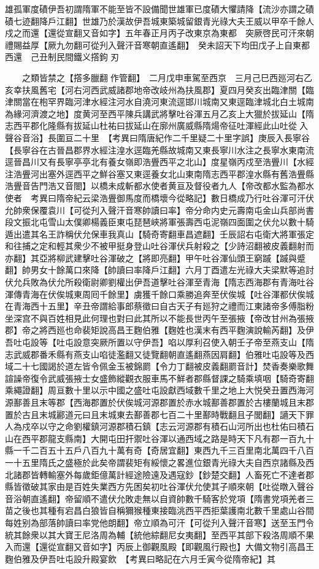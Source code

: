 雄孤軍度磧伊吾初謂隋軍不能至皆不設備聞世雄軍已度磧大懼請降【流沙亦謂之磧磧七迹翻降戶江翻】世雄乃於漢故伊吾城東築城留銀青光祿大夫王威以甲卒千餘人戍之而還【還從宣翻又音如字】五年春正月丙子改東京為東都　突厥啓民可汗來朝禮賜益厚【厥九勿翻可從刋入聲汗音寒朝直遙翻】　癸未詔天下均田戊子上自東都西還　己丑制民間鐵义撘鉤刃

　　之類皆禁之【撘多臘翻作管翻】　二月戊申車駕至西京　三月己巳西廵河右乙亥幸扶風舊宅【河右河西武威諸郡地帝改岐州為扶風郡】夏四月癸亥出臨津關【臨津關當在枹罕界臨河津水經注河水自澆河東流逕邯川城南又東逕臨津城北白土城南為緣河濟渡之地】度黄河至西平陳兵講武將擊吐谷渾五月乙亥上大獵於拔延山【隋志西平郡化隆縣有拔延山杜祐曰拔延山在廓州廣威縣隋煬帝征吐渾經此山吐從入聲谷音浴】長圍亘二十里　【考異曰隋唐紀作二千里疑二十里字誤】庚辰入長寧谷【長寧谷在古晉昌郡界水經注湟水逕臨羌縣故城南又東長寧川水注之長寧水東南流逕晉昌川又有長寧亭亭北有養女嶺即浩舋西平之北山】度星嶺丙戍至浩舋川【水經注浩舋河出塞外逕西平之鮮谷塞又東逕養女北山東南隋志西平郡湟水縣有舊浩舋縣浩舋音告門浩又音閤】以橋未成斬都水使者黄亘及督役者九人【帝改都水監為都水使者　考異曰隋帝紀云梁浩舋御馬度而橋壞今從略記】數日橋成乃行吐谷渾可汗伏允帥衆保覆袁川【可從刋入聲汗音寒帥讀曰率】帝分命内史元壽南屯金山兵部尚書段文振北屯雪山太僕卿楊義臣東屯琵琶峽將軍張壽西屯泥嶺四面圍之伏允以數十騎遁出遣其名王詐稱伏允保車我真山【騎奇寄翻車昌遮翻】壬辰詔右屯衛大將軍張定和往捕之定和輕其衆少不被甲挺身登山吐谷渾伏兵射殺之【少詩沼翻被皮義翻射而亦翻】其亞將柳武建擊吐谷渾破之【將即亮翻】甲午吐谷渾仙頭王窮䠞【䠞與蹙翻】帥男女十餘萬口來降【帥讀曰率降戶江翻】六月丁酉遣左光祿大夫梁默等追討伏允兵敗為伏允所殺衛尉卿劉權出伊吾道擊吐谷渾至青海【隋志西海郡有青海吐谷渾傳青海在伏俟城東周囘千餘里】虜獲千餘口乘勝追奔至伏俟城【吐谷渾都伏俟城在青海西十五里】辛丑帝謂給事郎蔡徵曰自古天子有廵狩之禮而江東諸帝多傅脂粉坐深宫不與百姓相見此何理也對曰此其所以不能長世丙午至張掖【帝改甘州為張掖郡】帝之將西廵也命裴矩說高昌王麴伯雅【麴姓也漢末有西平麴演說輸芮翻】及伊吾吐屯設等【吐屯設意突厥所置以守伊吾】啗以厚利召使入朝壬子帝至燕支山【隋志武威郡番禾縣有燕支山啗徒濫翻又徒覽翻朝直遙翻燕因肩翻】伯雅吐屯設等及西域二十七國謁於道左皆令佩金玉被錦罽【令力丁翻被皮義翻罽音計】焚香奏樂歌舞諠譟帝復令武威張掖士女盛飾縱觀衣服車馬不鮮者郡縣督課之騎乘填咽【騎奇寄翻乘繩證翻】周亘數十里以示中國之盛吐屯設獻西域數千里之地上大悦癸丑置西海河源鄯善且末等郡【西海郡置於伏俟城河源郡置於赤水城鄯善郡置於古樓蘭城且末郡置於古且末城酈道元曰且末城東去鄯善郡七百二十里鄯時戰翻且子閭翻】讁天下罪人為戍卒以守之命劉權鎮河源郡積石鎮【志云河源郡有積石山河所出也杜佑曰積石山在西平郡龍支縣南】大開屯田扞禦吐谷渾以通西域之路是時天下凡有郡一百九十縣一千二百五十五戶八百九十萬有奇【奇居宜翻】東西九千三百里南北萬四千八百一十五里隋氏之盛極於此矣帝謂裴矩有綏懷之畧進位銀青光祿大夫自西京諸縣及西北諸郡皆轉輸塞外每歲鉅億萬計經途險遠及遇寇鈔【鈔楚交翻】人畜死亡不達者郡縣皆徵破其家由是百姓失業西方先困矣初吐谷渾伏允使其子順來朝【吐從暾入聲谷音浴朝直遙翻】帝留順不遣伏允敗走無以自資帥數千騎客於党項【隋書党項羌者三苗之後也其種有宕昌白狼皆自稱獮猴種東接臨洮西平西拒葉護南北數千里處山谷間每姓别為部落帥讀曰率党他朗翻】帝立順為可汗【可從刋入聲汗音寒】送至玉門令統其餘衆以其大寶王尼洛周為輔【統他綜翻尼女夷翻】至西平其部下殺洛周順不果入而還【還從宣翻又音如字】丙辰上御觀風殿【即觀風行殿也】大備文物引高昌王麴伯雅及伊吾吐屯設升殿宴飲　【考異曰略記在六月壬寅今從隋帝紀】其